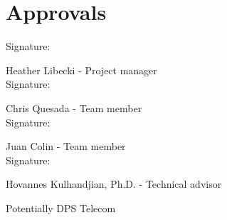\section{Approvals}
\setlength{\parindent}{15ex}
\vspace{0.5in}
	\begin{flushleft}
	Signature: \hrulefill
	
	\hspace*{0mm}\phantom{Approved: }Heather Libecki - Project manager\\
	\vspace{12pt}
	Signature: \hrulefill
	
	\hspace*{0mm}\phantom{Approved: }Chris Quesada - Team member\\
	\vspace{12pt}
	Signature: \hrulefill
	
	\hspace*{0mm}\phantom{Approved: }Juan Colin - Team member\\
	\vspace{12pt}
	Signature: \hrulefill
	
	\hspace*{0mm}\phantom{Approved: }Hovannes Kulhandjian, Ph.D. -
	 Technical advisor\\
	 \vspace{12pt}
	
	Potentially DPS Telecom
\end{flushleft}\par

\cite{de1}
\cite{SM}
\cite{SMD}


	
		
 

